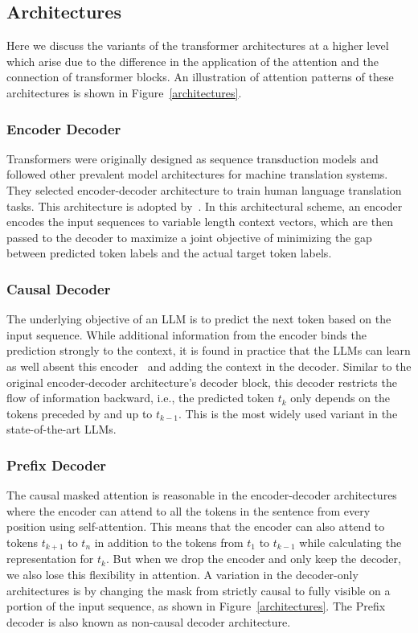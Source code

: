 \subsection{Architectures}
Here we discuss the variants of the transformer architectures at a higher level which arise due to the difference in the application of the attention and the connection of transformer blocks. An illustration of attention patterns of these architectures is shown in Figure~\ref{architectures}.

\subsubsection{Encoder Decoder}
Transformers were originally designed as sequence transduction models and followed other prevalent model architectures for machine translation systems. They selected encoder-decoder architecture to train human language translation tasks. This architecture is adopted by~\cite{T5, UL2}. In this architectural scheme, an encoder encodes the input sequences to variable length context vectors, which are then passed to the decoder to maximize a joint objective of minimizing the gap between predicted token labels and the actual target token labels.

\subsubsection{Causal Decoder}
The underlying objective of an LLM is to predict the next token based on the input sequence. While additional information from the encoder binds the prediction strongly to the context, it is found in practice that the LLMs can learn as well absent this encoder~\cite{decoderonly} and adding the context in the decoder. Similar to the original encoder-decoder architecture's decoder block, this decoder restricts the flow of information backward, i.e., the predicted token $t_k$ only depends on the tokens preceded by and up to $t_{k-1}$. This is the most widely used variant in the state-of-the-art LLMs.

\subsubsection{Prefix Decoder}
The causal masked attention is reasonable in the encoder-decoder architectures where the encoder can attend to all the tokens in the sentence from every position using self-attention. This means that the encoder can also attend to tokens $t_{k+1}$ to $t_n$ in addition to the tokens from $t_1$ to $t_{k-1}$ while calculating the representation for $t_k$. But when we drop the encoder and only keep the decoder, we also lose this flexibility in attention. A variation in the decoder-only architectures is by changing the mask from strictly causal to fully visible on a portion of the input sequence, as shown in Figure~\ref{architectures}. The Prefix decoder is also known as non-causal decoder architecture.

